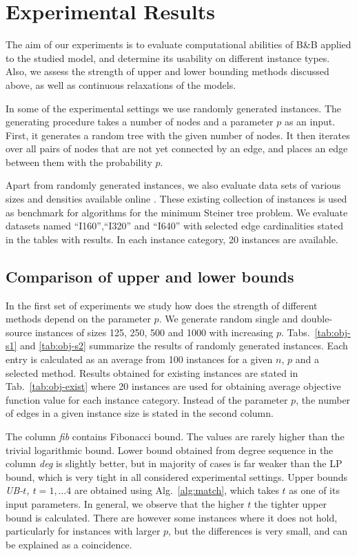 \section{Experimental Results} \label{sec:exp}

The aim of our experiments is to evaluate computational abilities of B\&B applied to the studied model, and determine its usability on different instance types.
Also, we assess the strength of upper and lower bounding methods discussed above, as well as continuous relaxations of the models.

In some of the experimental settings we use randomly generated instances.
The generating procedure takes a number of nodes and a parameter $p$ as an input.
First, it generates a random tree with the given number of nodes.
It then iterates over all pairs of nodes that are not yet connected by an edge, and places an edge between them with the probability $p$.

Apart from randomly generated instances, we also evaluate data sets of various sizes and densities available online \cite{steinlib}.
These existing collection of instances is used as benchmark for algorithms for the minimum Steiner tree problem.
We evaluate datasets named ``I160'',``I320'' and ``I640'' with selected edge cardinalities stated in the tables with results. 
In each instance category, 20 instances are available.

\subsection{Comparison of upper and lower bounds}

In the first set of experiments we study how does the strength of different methods depend on the parameter $p$.
We generate random single and double-source instances of sizes 125, 250, 500 and 1000 with increasing $p$.
Tabs.~\ref{tab:obj-s1} and \ref{tab:obj-s2} summarize the results of randomly generated instances.
Each entry is calculated as an average from 100 instances for a given $n$, $p$ and a selected method.
Results obtained for existing instances are stated in Tab.~\ref{tab:obj-exist} where 20 instances are used for obtaining average objective function value for each instance category.
Instead of the parameter $p$, the number of edges in a given instance size is stated in the second column.

The column \emph{fib} contains Fibonacci bound.
The values are rarely higher than the trivial logarithmic bound.
Lower bound obtained from degree sequence in the column \emph{deg} is slightly better, 
but in majority of cases is far weaker than the LP bound, which is very tight in all considered experimental settings.
Upper bounds \emph{UB-$t$, $t=1,\dots 4$} are obtained using Alg.~\ref{alg:match}, which takes $t$ as one of its input parameters.
In general, we observe that the higher $t$ the tighter upper bound is calculated.
There are however some instances where it does not hold, particularly for instances with larger $p$,  but the differences is very small, and can be explained as a coincidence.

